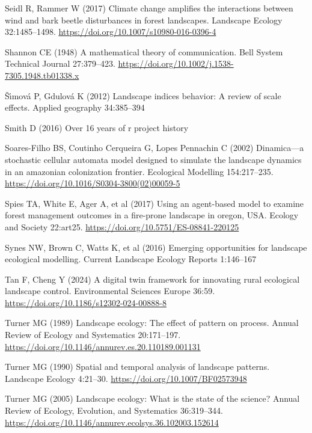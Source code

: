 \documentclass[
  10pt,
  a4paperpaper,
]{article}
\newlength{\cslhangindent}
\newenvironment{CSLReferences}[2] %
 {\begin{list}{}{%
  \setlength{\itemindent}{0pt}
  \setlength{\leftmargin}{0pt}
  \setlength{\parsep}{0pt}
  \ifodd #1
   \setlength{\leftmargin}{\cslhangindent}
   \setlength{\itemindent}{-1\cslhangindent}
  \fi
  \setlength{\itemsep}{#2\baselineskip}}}
 {\end{list}}
\begin{document}
\begin{CSLReferences}{1}{1}
Seidl R, Rammer W (2017) Climate change amplifies the interactions
between wind and bark beetle disturbances in forest landscapes.
Landscape Ecology 32:1485--1498.
\url{https://doi.org/10.1007/s10980-016-0396-4}

Shannon CE (1948) A mathematical theory of communication. Bell System
Technical Journal 27:379--423.
\url{https://doi.org/10.1002/j.1538-7305.1948.tb01338.x}

Šı́mová P, Gdulová K (2012) Landscape indices behavior: A review of scale
effects. Applied geography 34:385--394

Smith D (2016) Over 16 years of r project history

Soares-Filho BS, Coutinho Cerqueira G, Lopes Pennachin C (2002)
Dinamica---a stochastic cellular automata model designed to simulate the
landscape dynamics in an amazonian colonization frontier. Ecological
Modelling 154:217--235.
\url{https://doi.org/10.1016/S0304-3800(02)00059-5}

Spies TA, White E, Ager A, et al (2017) Using an agent-based model to
examine forest management outcomes in a fire-prone landscape in oregon,
USA. Ecology and Society 22:art25.
\url{https://doi.org/10.5751/ES-08841-220125}

Synes NW, Brown C, Watts K, et al (2016) Emerging opportunities for
landscape ecological modelling. Current Landscape Ecology Reports
1:146--167

Tan F, Cheng Y (2024) A digital twin framework for innovating rural
ecological landscape control. Environmental Sciences Europe 36:59.
\url{https://doi.org/10.1186/s12302-024-00888-8}

Turner MG (1989) Landscape ecology: The effect of pattern on process.
Annual Review of Ecology and Systematics 20:171--197.
\url{https://doi.org/10.1146/annurev.es.20.110189.001131}

Turner MG (1990) Spatial and temporal analysis of landscape patterns.
Landscape Ecology 4:21--30. \url{https://doi.org/10.1007/BF02573948}

Turner MG (2005) Landscape ecology: What is the state of the science?
Annual Review of Ecology, Evolution, and Systematics 36:319--344.
\url{https://doi.org/10.1146/annurev.ecolsys.36.102003.152614}


\end{CSLReferences}
\end{document}
